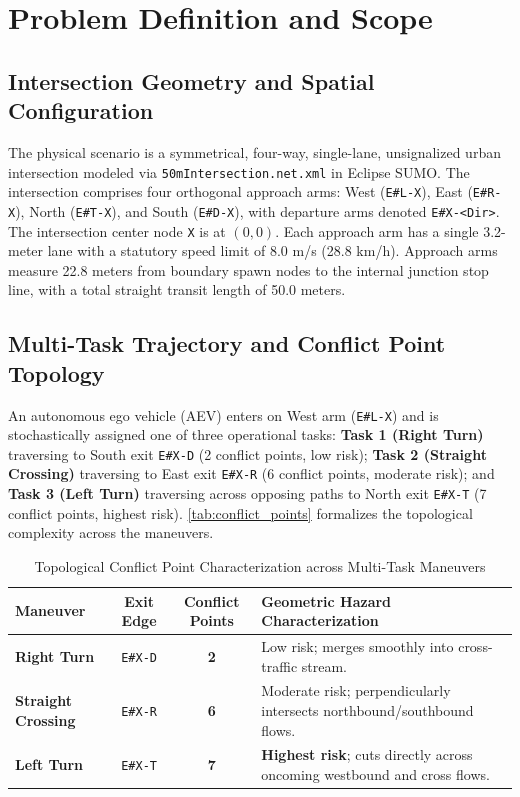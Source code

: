 \chapter{Problem Definition and Scope}
\label{ch:problem_scope}

\section{Intersection Geometry and Spatial Configuration}
The physical scenario is a symmetrical, four-way, single-lane, unsignalized urban intersection modeled via \texttt{50mIntersection.net.xml} in Eclipse SUMO. The intersection comprises four orthogonal approach arms: West (\texttt{E\#L-X}), East (\texttt{E\#R-X}), North (\texttt{E\#T-X}), and South (\texttt{E\#D-X}), with departure arms denoted \texttt{E\#X-<Dir>}. The intersection center node \texttt{X} is at $(0, 0)$. Each approach arm has a single 3.2-meter lane with a statutory speed limit of 8.0 m/s (28.8 km/h). Approach arms measure 22.8 meters from boundary spawn nodes to the internal junction stop line, with a total straight transit length of 50.0 meters.

\section{Multi-Task Trajectory and Conflict Point Topology}
An autonomous ego vehicle (AEV) enters on West arm (\texttt{E\#L-X}) and is stochastically assigned one of three operational tasks: \textbf{Task 1 (Right Turn)} traversing to South exit \texttt{E\#X-D} (2 conflict points, low risk); \textbf{Task 2 (Straight Crossing)} traversing to East exit \texttt{E\#X-R} (6 conflict points, moderate risk); and \textbf{Task 3 (Left Turn)} traversing across opposing paths to North exit \texttt{E\#X-T} (7 conflict points, highest risk). \autoref{tab:conflict_points} formalizes the topological complexity across the maneuvers.

\vspace{-0.2cm}
\begin{table}[htbp]
\centering
\footnotesize
\renewcommand{\arraystretch}{0.95}
\begin{tabular}{|l|c|c|p{7.5cm}|}
\hline
\textbf{Maneuver} & \textbf{Exit Edge} & \textbf{Conflict Points} & \textbf{Geometric Hazard Characterization} \\ \hline
\textbf{Right Turn} & \texttt{E\#X-D} & \textbf{2} & Low risk; merges smoothly into cross-traffic stream. \\ \hline
\textbf{Straight Crossing} & \texttt{E\#X-R} & \textbf{6} & Moderate risk; perpendicularly intersects northbound/southbound flows. \\ \hline
\textbf{Left Turn} & \texttt{E\#X-T} & \textbf{7} & \textbf{Highest risk}; cuts directly across oncoming westbound and cross flows. \\ \hline
\end{tabular}
\vspace{-0.2cm}
\caption{Topological Conflict Point Characterization across Multi-Task Maneuvers}
\label{tab:conflict_points}
\end{table}

